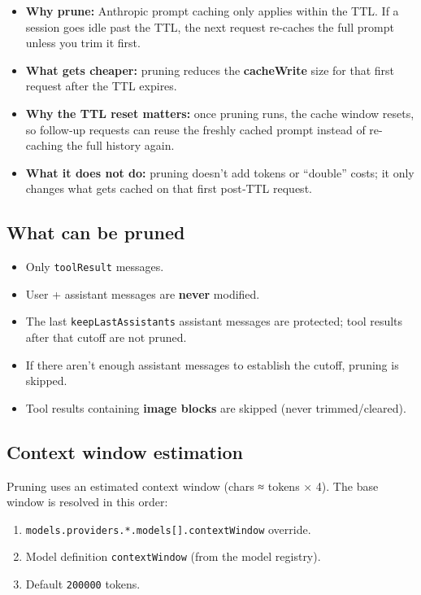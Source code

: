 \begin{itemize}
  \item \textbf{Why prune:} Anthropic prompt caching only applies within the TTL. If a session goes idle past the TTL, the next request re-caches the full prompt unless you trim it first.
  \item \textbf{What gets cheaper:} pruning reduces the \textbf{cacheWrite} size for that first request after the TTL expires.
  \item \textbf{Why the TTL reset matters:} once pruning runs, the cache window resets, so follow‑up requests can reuse the freshly cached prompt instead of re-caching the full history again.
  \item \textbf{What it does not do:} pruning doesn’t add tokens or “double” costs; it only changes what gets cached on that first post‑TTL request.
\end{itemize}


\subsection{What can be pruned}


\begin{itemize}
  \item Only \texttt{toolResult} messages.
  \item User + assistant messages are \textbf{never} modified.
  \item The last \texttt{keepLastAssistants} assistant messages are protected; tool results after that cutoff are not pruned.
  \item If there aren’t enough assistant messages to establish the cutoff, pruning is skipped.
  \item Tool results containing \textbf{image blocks} are skipped (never trimmed/cleared).
\end{itemize}


\subsection{Context window estimation}


Pruning uses an estimated context window (chars ≈ tokens × 4). The base window is resolved in this order:

\begin{enumerate}
  \item \texttt{models.providers.*.models[].contextWindow} override.
  \item Model definition \texttt{contextWindow} (from the model registry).
  \item Default \texttt{200000} tokens.
\end{enumerate}


